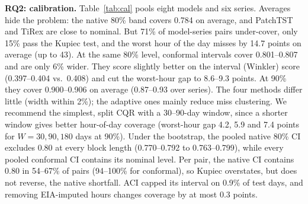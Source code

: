 \documentclass[conference]{IEEEtran}
\begin{document}
\textbf{RQ2: calibration.} Table~\ref{tab:cal} pools eight models and six series. Averages hide the problem: the native 80\% band covers 0.784 on average, and PatchTST and TiRex are close to nominal. But 71\% of model-series pairs under-cover, only 15\% pass the Kupiec test, and the worst hour of the day misses by 14.7 points on average (up to 43). At the same 80\% level, conformal intervals cover 0.801--0.807 and are only 6\% wider. They score slightly better on the interval (Winkler) score (0.397--0.404 vs.\ 0.408) and cut the worst-hour gap to 8.6--9.3 points. At 90\% they cover 0.900--0.906 on average (0.87--0.93 over series). The four methods differ little (width within 2\%); the adaptive ones mainly reduce miss clustering. We recommend the simplest, split CQR with a 30--90-day window, since a shorter window gives better hour-of-day coverage (worst-hour gap 4.2, 5.9 and 7.4 points for $W=30,90,180$ days at 90\%). Under the bootstrap, the pooled native 80\% CI excludes 0.80 at every block length (0.770--0.792 to 0.763--0.799), while every pooled conformal CI contains its nominal level. Per pair, the native CI contains 0.80 in 54--67\% of pairs (94--100\% for conformal), so Kupiec overstates, but does not reverse, the native shortfall. ACI capped its interval on 0.9\% of test days, and removing EIA-imputed hours changes coverage by at most 0.3 points.
\end{document}
